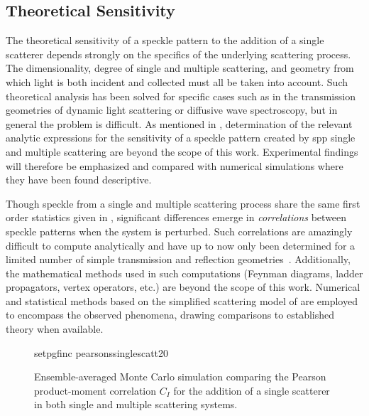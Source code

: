 \subsection{Theoretical Sensitivity}
The theoretical sensitivity of a speckle pattern to the addition of a single
scatterer depends strongly on the specifics of the underlying scattering
process.  The dimensionality, degree of single and multiple scattering, and
geometry from which light is both incident and collected must all be taken
into account.  Such theoretical analysis has been solved for specific cases
such as in the transmission geometries of dynamic light scattering or
diffusive wave spectroscopy, but in general the problem is difficult.  As
mentioned in , determination of the relevant analytic
expressions for the sensitivity of a speckle pattern created by \gls{spp} single and
multiple scattering are beyond the scope of this work.  Experimental findings
will therefore be emphasized and compared with numerical simulations where
they have been found descriptive.

Though speckle from a single and multiple scattering process share the same
first order statistics given in , significant differences
emerge in \textit{correlations} between speckle patterns when the system is
perturbed.  Such correlations are amazingly difficult to compute analytically
and have up to now only been determined for a limited number of simple
transmission and reflection geometries~\cite{berkovits1994correlations}.
Additionally, the mathematical methods used in such computations (Feynman
diagrams, ladder propagators, vertex operators, etc.) are beyond the scope of
this work.  Numerical and statistical methods based on the simplified
scattering model of  are employed
to encompass the observed phenomena, drawing comparisons to established theory
when available.

\begin{figure}
	\centering
	{setpgfinc}
	{pearsonssinglescatt20}
	\caption{Ensemble-averaged Monte Carlo simulation comparing the Pearson
		product-moment correlation $C_I$ for the addition of a single scatterer in
		both single and multiple scattering systems.}
	\label{fig:scatteringpearson}
\end{figure}

